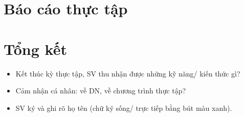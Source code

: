 \documentclass[a4paper]{article}
\theoremstyle{definition}
\begin{document}
\newpage
\tableofcontents
\newpage


\section{Báo cáo thực tập}

\section{Tổng kết}
\begin{itemize}
    \item Kết thúc kỳ thực tập, SV thu nhận được những kỹ năng/ kiến thức gì?
\item Cảm nhận cá nhân: về DN, về chương trình thực tập?
\item SV ký và ghi rõ họ tên (chữ ký sống/ trực tiếp bằng bút màu xanh).

\end{itemize}

\end{document}
